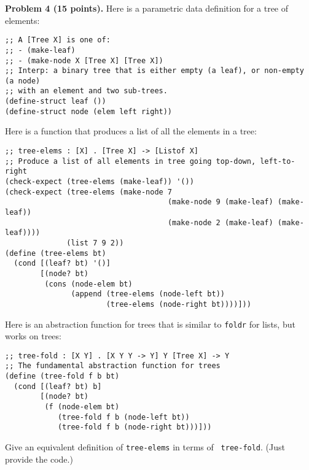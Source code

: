 \documentclass[12pt]{article}
\begin{document}


\newpage 
\noindent
{\bf Problem 4 (15 points).}
%
Here is a parametric data definition for a tree of elements:
\begin{verbatim}
;; A [Tree X] is one of:
;; - (make-leaf)
;; - (make-node X [Tree X] [Tree X])
;; Interp: a binary tree that is either empty (a leaf), or non-empty (a node)
;; with an element and two sub-trees.
(define-struct leaf ())
(define-struct node (elem left right))
\end{verbatim}









\noindent
Here is a function that produces a list of all the elements in a tree:
\begin{verbatim}
;; tree-elems : [X] . [Tree X] -> [Listof X]
;; Produce a list of all elements in tree going top-down, left-to-right
(check-expect (tree-elems (make-leaf)) '())
(check-expect (tree-elems (make-node 7 
                                     (make-node 9 (make-leaf) (make-leaf))
                                     (make-node 2 (make-leaf) (make-leaf))))
              (list 7 9 2))
(define (tree-elems bt)
  (cond [(leaf? bt) '()]
        [(node? bt)
         (cons (node-elem bt)
               (append (tree-elems (node-left bt))
                       (tree-elems (node-right bt))))]))
\end{verbatim}
Here is an abstraction function for trees that is similar to
{\tt foldr} for lists, but works on trees:
\begin{verbatim}
;; tree-fold : [X Y] . [X Y Y -> Y] Y [Tree X] -> Y
;; The fundamental abstraction function for trees
(define (tree-fold f b bt)
  (cond [(leaf? bt) b]
        [(node? bt)
         (f (node-elem bt)
            (tree-fold f b (node-left bt))
            (tree-fold f b (node-right bt)))]))
\end{verbatim}
Give an equivalent definition of {\tt tree-elems} in terms of {\tt
  tree-fold}.  (Just provide the code.)
\end{document}
